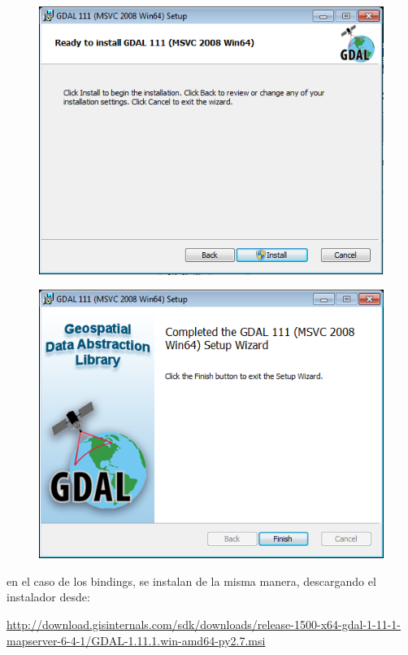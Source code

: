 \documentclass[11pt, spanish]{memoir}
\begin{document}
\begin{figure}[H]
\centering
\includegraphics[width=14cm]{gdal4.png}
\end{figure}

\begin{figure}[H]
\centering
\includegraphics[width=14cm]{gdal5.png}
\end{figure}

en el caso de los bindings, se instalan de la misma manera, descargando el instalador desde:

\url{http://download.gisinternals.com/sdk/downloads/release-1500-x64-gdal-1-11-1-mapserver-6-4-1/GDAL-1.11.1.win-amd64-py2.7.msi}
\end{document}
